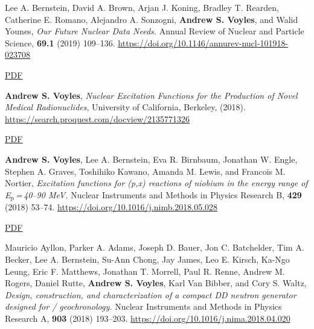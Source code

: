 \begin{bibsection}
\item Lee A. Bernstein,  David A. Brown,  Arjan J. Koning, Bradley T. Rearden,  Catherine E. Romano, Alejandro A. Sonzogni,  \textbf{Andrew S. Voyles}, and Walid Younes, \emph{Our Future Nuclear Data Needs.} Annual Review of Nuclear and Particle Science, \textbf{69.1} (2019) 109--136.
 \url{https://doi.org/10.1146/annurev-nucl-101918-023708}


\ifshort \vspace{0.1cm} \href{https://avoyles.github.io/papers/Bernstein2019_NuclearData.pdf}{\underline{PDF}} \else  \fi 



\item \textbf{Andrew S. Voyles}, \emph{Nuclear Excitation Functions for the Production of Novel Medical Radionuclides}, University of California, Berkeley, (2018). \url{https://search.proquest.com/docview/2135771326}


\ifshort \vspace{0.1cm} \href{https://avoyles.github.io/papers/ASV_Dissertation.pdf}{\underline{PDF}} \else  \fi 


\item \textbf{Andrew S. Voyles}, Lee A. Bernstein, Eva R. Birnbaum, Jonathan W. Engle, Stephen A. Graves, Toshihiko Kawano, Amanda M. Lewis, and Francois M. Nortier, \emph{Excitation functions for (p,x) reactions of niobium in the energy range of  E$_{\text{p}}$\,=\,40--90 MeV.} Nuclear Instruments and Methods in Physics Research  B, 
\textbf{429} (2018) 53--74. \url{https://doi.org/10.1016/j.nimb.2018.05.028} 


  
\ifshort \vspace{0.1cm} \href{https://avoyles.github.io/papers/Voyles2018_Nb_px.pdf}{\underline{PDF}} \else  \fi 
    
    

\item Mauricio Ayllon, Parker A. Adams, Joseph D. Bauer, Jon C. Batchelder, Tim A. Becker, Lee A. Bernstein, Su-Ann Chong, Jay James, Leo E. Kirsch, Ka-Ngo Leung, Eric F. Matthews, Jonathan T. Morrell, Paul R. Renne, Andrew M. Rogers, Daniel Rutte, \textbf{Andrew S. Voyles}, Karl Van Bibber, and Cory S. Waltz, \emph{Design, construction, and characterization of a compact DD neutron generator designed for / geochronology.} Nuclear Instruments and Methods in Physics Research  A, 
\textbf{903} (2018) 193--203. \url{https://doi.org/10.1016/j.nima.2018.04.020} 


\end{bibsection}
